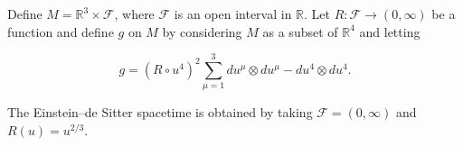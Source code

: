 Define $M = \mathbb{R}^3 \times \mathcal{F}$, where $\mathcal{F}$ is an open interval in $\mathbb{R}$. Let $R: \mathcal{F} \rightarrow (0, \infty)$ be a function and define $g$ on $M$ by considering $M$ as a subset of $\mathbb{R}^4$ and letting

$$g = (R \circ u^4)^2 \sum_{\mu=1}^{3} du^\mu \otimes du^\mu - du^4 \otimes du^4.$$

The Einstein–de Sitter spacetime is obtained by taking $\mathcal{F} = (0, \infty)$ and $R(u) = u^{2/3}$.
